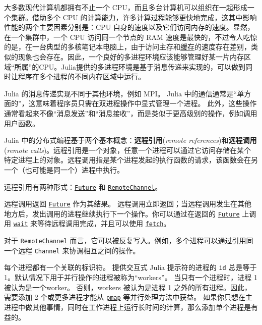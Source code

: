大多数现代计算机都拥有不止一个 CPU，而且多台计算机可以组织在一起形成一个集群。借助多个 CPU 的计算能力，许多计算过程能够更快地完成，这其中影响性能的两个主要因素分别是：CPU 自身的速度以及它们访问内存的速度。显然，在一个集群中，一个 CPU 访问同一个节点的 RAM 速度是最快的，不过令人吃惊的是，在一台典型的多核笔记本电脑上，由于访问主存和\href{https://www.akkadia.org/drepper/cpumemory.pdf}{缓存}的速度存在差别，类似的现象也会存在。因此，一个良好的多进程环境应该能够管理好某一片内存区域“所属”的CPU。Julia提供的多进程环境是基于消息传递来实现的，可以做到同时让程序在多个进程的不同内存区域中运行。



Julia 的消息传递实现不同于其他环境，例如 MPI\footnotemark[1]。 Julia 中的通信通常是“单方面的”，这意味着程序员只需在双进程操作中显式管理一个进程。 此外，这些操作通常看起来不像“消息发送”和“消息接收”，而是类似于更高级别的操作，例如调用用户函数。



Julia 中的分布式编程基于两个基本概念：\textbf{远程引用}(\emph{remote references})和\textbf{远程调用}(\emph{remote calls})。远程引用是一个对象，任意一个进程可以通过它访问存储在某个特定进程上的对象。远程调用指是某个进程发起的执行函数的请求，该函数会在另一个（也可能是同一个）进程中执行。



远程引用有两种形式：\hyperlink{4170271048165085864}{\texttt{Future}} 和 \hyperlink{16773267780467157552}{\texttt{RemoteChannel}}。



远程调用返回 \hyperlink{4170271048165085864}{\texttt{Future}} 作为其结果。 远程调用立即返回；当远程调用发生在其他地方后，发出调用的进程继续执行下一个操作。你可以通过在返回的 \hyperlink{4170271048165085864}{\texttt{Future}} 上调用 \hyperlink{13761789780433862250}{\texttt{wait}} 来等待远程调用完成，并且可以使用 \hyperlink{11007884648860062495}{\texttt{fetch}}。



对于 \hyperlink{16773267780467157552}{\texttt{RemoteChannel}} 而言，它可以被反复写入。例如，多个进程可以通过引用同一个远程 \texttt{Channel} 来协调相互之间的操作。



每个进程都有一个关联的标识符。 提供交互式 Julia 提示符的进程的 \texttt{id} 总是等于 1。默认情况下用于并行操作的进程被称为“workers”。 当只有一个进程时，进程 1 被认为是一个worker。 否则，workers 被认为是进程 1 之外的所有进程。因此，需要添加 2 个或更多进程才能从 \hyperlink{9432281416771383761}{\texttt{pmap}} 等并行处理方法中获益。 如果你只想在主进程中做其他事情，同时在工作进程上运行长时间的计算，那么添加单个进程是有益的。



